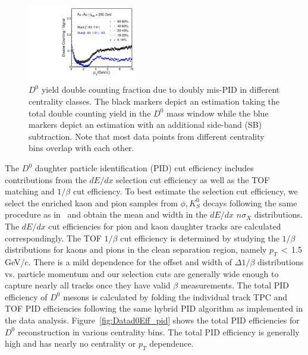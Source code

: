 \documentclass[%
 reprint,	
showpacs,
 amsmath,amssymb,
 aps,
 prc,
]{revtex4-1}
\begin{document}
\begin{figure}
\centering
\includegraphics[width=0.43\textwidth]{fig/Double_counting.pdf}
\caption{$D^{0}$ yield double counting fraction due to doubly mis-PID in different centrality classes. The black markers depict an estimation taking the total double counting yield in the $D^0$ mass window while the blue markers depict an estimation with an additional side-band (SB) subtraction. Note that most data points from different centrality bins overlap with each other.}
\label{fig:Datad0Eff_doublecounting} 
\end{figure}

The $D^0$ daughter particle identification (PID) cut efficiency includes contributions from the $dE/dx$ selection cut efficiency as well as the TOF matching and $1/\beta$ cut efficiency. To best estimate the selection cut efficiency, we select the enriched kaon and pion samples from $\phi,K_{S}^{0}$ decays following the same procedure as in~\cite{Shao:2005iu,Xu:2008th} and obtain the mean and width in the $dE/dx$ $n\sigma_X$ distributions. The $dE/dx$ cut efficiencies for pion and kaon daughter tracks are calculated correspondingly. The TOF $1/\beta$ cut efficiency is determined by studying the $1/\beta$ distributions for kaons and pions in the clean separation region, namely $p_{T}$\,$<$\,1.5\,GeV/$c$. There is a mild dependence for the offset and width of $\Delta 1/\beta$ distributions vs. particle momentum and our selection cuts are generally wide enough to capture nearly all tracks once they have valid $\beta$ measurements. The total PID efficiency of $D^0$ mesons is calculated by folding the individual track TPC and TOF PID efficiencies following the same hybrid PID algorithm as implemented in the data analysis. Figure~\ref{fig:Datad0Eff_pid} shows the total PID efficiencies for $D^0$ reconstruction in various centrality bins. The total PID efficiency is generally high and has nearly no centrality or $p_T$ dependence.
\end{document}
